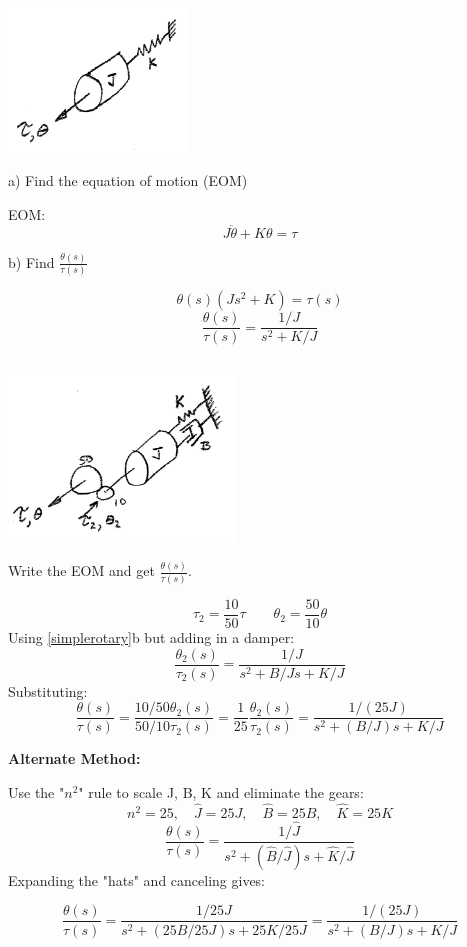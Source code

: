 \documentclass{article}	%
\begin{document}
\includegraphics[width=48mm]{00460a.png}

a) Find the equation of motion (EOM)

\begin{solution}
EOM:
\[
J\ddot{\theta} + K\theta = \tau
\]
\end{solution}

b) Find $\frac{\theta(s)}{\tau(s)}$\label{simplerotary}

\begin{solution}
\[
\theta(s) \left ( Js^2+K \right ) = \tau(s)
\]
\[
\frac{\theta(s)} {\tau(s)}   =  \frac {1/J}    {s^2 + K/J}
\]
\end{solution}


\subsection{}

\includegraphics[width=60mm]{00461a.png}

Write the EOM and get $\frac{\theta(s)}{\tau(s)}$.

\begin{solution}
\[
\tau_2 = \frac{10}{50}\tau \qquad \theta_2 = \frac{50}{10}\theta
\]
Using \ref{simplerotary}b but adding in a damper:
\[
\frac{\theta_2(s)} {\tau_2(s)}   =  \frac {1/J}    {s^2 + B/Js+ K/J}
\]
Substituting:
\[
\frac{\theta(s)} {\tau(s)}   =
\frac{10/50\theta_2(s)} {50/10\tau_2(s)}   = \frac{1}{25} \frac{\theta_2(s)} {\tau_2(s)}  =  \frac {1/(25J)}    {s^2  + (B/J)s+ K/J}
\]

\vspace{0.2in}
{\bf Alternate Method:}

Use the "$n^2$" rule to scale J, B, K and eliminate the gears:
\[
n^2 = 25, \quad \hat{J} = 25J, \quad \hat{B} = 25B, \quad \hat{K} = 25K
\]
\[
\frac{\theta(s)} {\tau(s)}   =
  \frac {1/\hat{J}}    {s^2 + (\hat{B}/\hat{J})s+ \hat{K}/\hat{J}}
\]
Expanding the "hats" and canceling gives:

\[
\frac{\theta(s)} {\tau(s)}   =
\frac {1/25{J}}    {s^2 + (25{B}/25{J})s+ 25{K}/25{J}} =  \frac {1/(25J)}    {s^2  +(B/J)s+ K/J}
\]
\end{solution}
\end{document}

